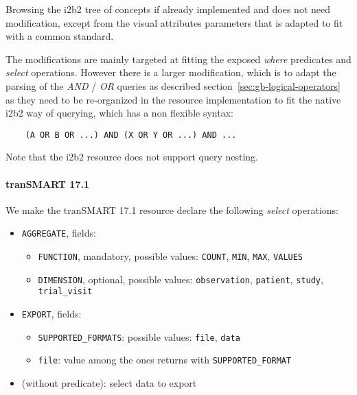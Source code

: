 Browsing the i2b2 tree of concepts if already implemented and does not need modification, except from the visual attributes parameters that is adapted to fit with a common standard.

The modifications are mainly targeted at fitting the exposed \emph{where} predicates and \emph{select} operations.
However there is a larger modification, which is to adapt the parsing of the \emph{AND} / \emph{OR} queries as described section~\ref{sec:gb-logical-operators} as they need to be re-organized in the resource implementation to fit the native i2b2 way of querying, which has a non flexible syntax:
\begin{verbatim}
    (A OR B OR ...) AND (X OR Y OR ...) AND ...
\end{verbatim}
Note that the i2b2 resource does not support query nesting.


\paragraph{tranSMART 17.1}
\label{sec:irct-res-transmart-17.1}

We make the tranSMART 17.1 resource declare the following \emph{select} operations:
\begin{itemize}
    \item \verb|AGGREGATE|, fields:
    \begin{itemize}
        \item \verb|FUNCTION|, mandatory, possible values:
        \verb|COUNT|,
        \verb|MIN|,
        \verb|MAX|,
        \verb|VALUES|
        
        \item \verb|DIMENSION|, optional, possible values:
        \verb|observation|,
        \verb|patient|,
        \verb|study|,
        \verb|trial_visit|
    \end{itemize}
    
    \item \verb|EXPORT|, fields:
    \begin{itemize}
        \item \verb|SUPPORTED_FORMATS|: possible values: \verb|file|, \verb|data|
        \item \verb|file|: value among the ones returns with \verb|SUPPORTED_FORMAT|
    \end{itemize}
    
    \item (without predicate): select data to export
\end{itemize}

